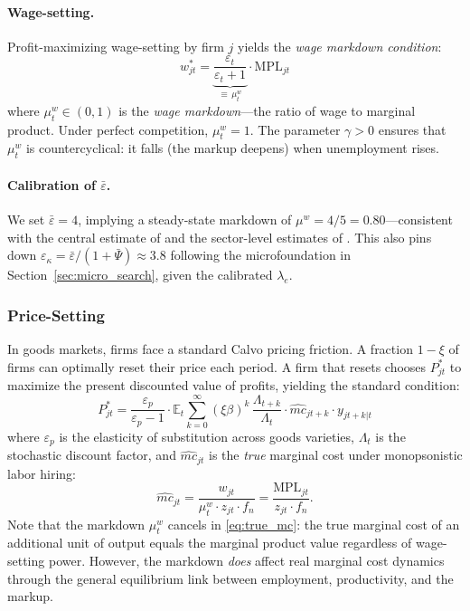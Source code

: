 \paragraph{Wage-setting.}
Profit-maximizing wage-setting by firm $j$ yields the \emph{wage markdown
condition}:
\begin{equation}
  w_{jt}^* = \underbrace{\frac{\varepsilon_t}{\varepsilon_t + 1}}_{\equiv\,\mu_t^w} \cdot
  \mathrm{MPL}_{jt}
  \label{eq:wage_markdown}
\end{equation}
where $\mu_t^w \in (0,1)$ is the \emph{wage markdown}---the ratio of wage to
marginal product. Under perfect competition, $\mu_t^w = 1$. The parameter
$\gamma > 0$ ensures that $\mu_t^w$ is countercyclical: it falls (the markup
deepens) when unemployment rises.

\paragraph{Calibration of $\bar\varepsilon$.}
We set $\bar\varepsilon = 4$, implying a steady-state markdown of
$\mu^w = 4/5 = 0.80$---consistent with the central estimate of
\citet{manning2021monopsony} and the sector-level estimates of
\citet{dube2020monopsony}. This also pins down $\varepsilon_\kappa = \bar\varepsilon/(1+\bar\Psi) \approx 3.8$
following the microfoundation in Section~\ref{sec:micro_search}, given the calibrated $\lambda_e$.

\subsubsection{Price-Setting}

In goods markets, firms face a standard Calvo \citeyearpar{calvo1983} pricing
friction. A fraction $1-\xi$ of firms can optimally reset their price each
period. A firm that resets chooses $P_{jt}^*$ to maximize the present
discounted value of profits, yielding the standard condition:
\begin{equation}
  P_{jt}^* = \frac{\varepsilon_p}{\varepsilon_p - 1} \cdot
  \mathbb{E}_t\sum_{k=0}^{\infty}(\xi\beta)^k\,\frac{\Lambda_{t+k}}{\Lambda_t}
  \cdot \widehat{mc}_{jt+k} \cdot y_{jt+k|t}
  \label{eq:optimal_price}
\end{equation}
where $\varepsilon_p$ is the elasticity of substitution across goods varieties,
$\Lambda_t$ is the stochastic discount factor, and $\widehat{mc}_{jt}$ is
the \emph{true} marginal cost under monopsonistic labor hiring:
\begin{equation}
  \widehat{mc}_{jt} = \frac{w_{jt}}{\mu_t^w \cdot z_{jt} \cdot f_n}
  = \frac{\mathrm{MPL}_{jt}}{z_{jt} \cdot f_n}.
  \label{eq:true_mc}
\end{equation}
Note that the markdown $\mu_t^w$ cancels in \eqref{eq:true_mc}: the true
marginal cost of an additional unit of output equals the marginal product
value regardless of wage-setting power. However, the markdown \emph{does}
affect real marginal cost dynamics through the general equilibrium link between
employment, productivity, and the markup.

